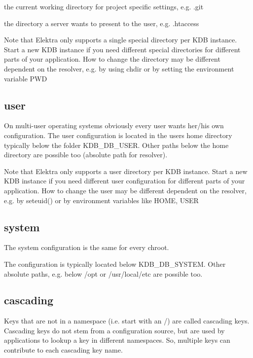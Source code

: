 \begin{DoxyItemize}
\item the current working directory for project specific settings, e.\+g. .git
\item the directory a server wants to present to the user, e.\+g. .htaccess
\end{DoxyItemize}

Note that Elektra only supports a single special directory per K\+D\+B instance. Start a new K\+D\+B instance if you need different special directories for different parts of your application. How to change the directory may be different dependent on the resolver, e.\+g. by using chdir or by setting the environment variable P\+W\+D

\subsection*{user}

On multi-\/user operating systems obviously every user wants her/his own configuration. The user configuration is located in the users home directory typically below the folder K\+D\+B\+\_\+\+D\+B\+\_\+\+U\+S\+E\+R. Other paths below the home directory are possible too (absolute path for resolver).

Note that Elektra only supports a user directory per K\+D\+B instance. Start a new K\+D\+B instance if you need different user configuration for different parts of your application. How to change the user may be different dependent on the resolver, e.\+g. by seteuid() or by environment variables like H\+O\+M\+E, U\+S\+E\+R

\subsection*{system}

The system configuration is the same for every chroot.

The configuration is typically located below K\+D\+B\+\_\+\+D\+B\+\_\+\+S\+Y\+S\+T\+E\+M. Other absolute paths, e.\+g. below /opt or /usr/local/etc are possible too.

\subsection*{cascading}

Keys that are not in a namespace (i.\+e. start with an {\ttfamily /}) are called cascading keys. Cascading keys do not stem from a configuration source, but are used by applications to lookup a key in different namespaces. So, multiple keys can contribute to each cascading key name.

